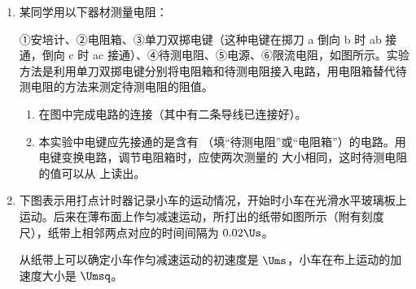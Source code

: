 \documentclass[\gkver]{gaokaozhenti}
\begin{document}
\begin{enumerate}
{\begin{enumerate}
	\item
	小

	\item
	$190\UO$

\end{enumerate}
}

\item
某同学用以下器材测量电阻：

①安培计、②电阻箱、③单刀双掷电键（这种电键在掷刀 a 倒向 b 时 ab 接通，倒向 c 时 ac 接通）、④待测电阻、⑤电源、⑥限流电阻，如图所示。实验方法是利用单刀双掷电键分别将电阻箱和待测电阻接入电路，用电阻箱替代待测电阻的方法来测定待测电阻的阻值。
\begin{enumerate}
	\item
	在图中完成电路的连接（其中有二条导线已连接好）。

	\item
	本实验中电键应先接通的是含有 （填“待测电阻”或“电阻箱”）的电路。用电键变换电路，调节电阻箱时，应使两次测量的  大小相同，这时待测电阻的值可以从  上读出。
\end{enumerate}
\onepicture[align=right, w=7cm]{}


\item
下图表示用打点计时器记录小车的运动情况，开始时小车在光滑水平玻璃板上运动。后来在薄布面上作匀减速运动，所打出的纸带如图所示（附有刻度尺），纸带上相邻两点对应的时间间隔为 $0.02\Us$。

从纸带上可以确定小车作匀减速运动的初速度是  $\Ums$，小车在布上运动的加速度大小是  $\Umsq$。
\onepicture[align=right, w=12cm]{}


\end{enumerate}
\end{document}
